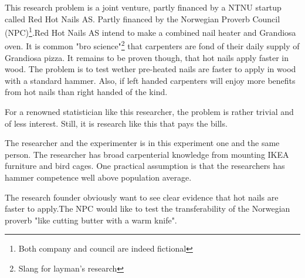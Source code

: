 This research problem is a joint venture, partly financed by a NTNU startup called Red Hot Nails AS. Partly financed by the Norwegian Proverb Council (NPC)\footnote{Both company and council are indeed fictional}.Red Hot Nails AS intend to make a combined nail heater and Grandiosa oven. It is common "bro science"\footnote{Slang for layman's research} that carpenters are fond of their daily supply of Grandiosa pizza. It remains to be proven though, that hot nails apply faster in wood. The problem is to test wether pre-heated nails are faster to apply in wood with a standard hammer. Also, if left handed carpenters will enjoy more benefits from hot nails than right handed of the kind.

For a renowned statistician like this researcher, the problem is rather trivial and of less interest. Still, it is research like this that pays the bills.

The researcher and the experimenter is in this experiment one and the same person. The researcher has broad carpenterial knowledge from mounting IKEA furniture and bird cages. One practical assumption is that the researchers has hammer competence well above population average.

The research founder obviously want to see clear evidence that hot nails are faster to apply.The NPC would like to test the transferability of the Norwegian proverb "like cutting butter with a warm knife".